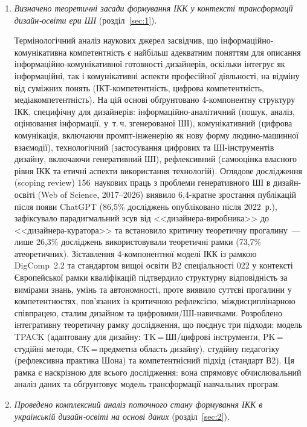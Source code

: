 \begin{enumerate}

\item \textit{Визначено теоретичні засади формування ІКК у контексті трансформації дизайн-освіти ери ШІ} (розділ~\ref{sec:1}).

Термінологічний аналіз наукових джерел засвідчив, що інформаційно-комунікативна компетентність є найбільш адекватним поняттям для описання інформаційно-комунікативної готовності дизайнерів, оскільки інтегрує як інформаційні, так і комунікативні аспекти професійної діяльності, на відміну від суміжних понять (ІКТ-компетентність, цифрова компетентність, медіакомпетентність). На цій основі обґрунтовано 4-компонентну структуру ІКК, специфічну для дизайнерів: інформаційно-аналітичний (пошук, аналіз, оцінювання інформації, у~т.\,ч. згенерованої ШІ), комунікативний (цифрова комунікація, включаючи промпт-інженерію як нову форму людино-машинної взаємодії), технологічний (застосування цифрових та ШІ-інструментів дизайну, включаючи генеративний ШІ), рефлексивний (самооцінка власного рівня ІКК та етичні аспекти використання технологій). Оглядове дослідження (scoping review) 156~наукових праць з проблеми генеративного ШІ в дизайн-освіті (Web of Science, 2017--2026) виявило 6,4-кратне зростання публікацій після появи ChatGPT (86,5\% досліджень опубліковано після 2022~р.), зафіксувало парадигмальний зсув від <<дизайнера-виробника>> до <<дизайнера-куратора>> та встановило критичну теоретичну прогалину~--- лише 26,3\% досліджень використовували теоретичні рамки (73,7\% атеоретичних). Зіставлення 4-компонентної моделі ІКК із рамкою DigComp~2.2 та стандартом вищої освіти В2 спеціальності 022 у контексті Європейської рамки кваліфікацій підтвердило структурну відповідність за вимірами знань, умінь та автономності, проте виявило суттєві прогалини у компетентностях, пов'язаних із критичною рефлексією, міждисциплінарною співпрацею, сталим дизайном та цифровими/ШІ-навичками. Розроблено інтегративну теоретичну рамку дослідження, що поєднує три підходи: модель TPACK (адаптовану для дизайну: TK\,=\,ШІ/цифрові інструменти, PK\,=\,студійні методи, CK\,=\,предметна область дизайну), студійну педагогіку (рефлексивна практика Шона) та компетентнісний підхід (стандарт В2). Ця рамка є наскрізною для всього дослідження: вона спрямовує обчислювальний аналіз даних та обґрунтовує модель трансформації навчальних програм.

\item \textit{Проведено комплексний аналіз поточного стану формування ІКК в українській дизайн-освіті на основі даних} (розділ~\ref{sec:2}).


\end{enumerate}
